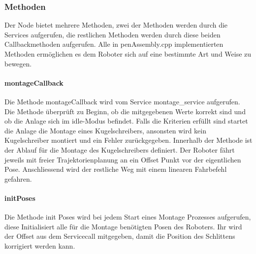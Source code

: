 \subsubsection{Methoden}
Der Node bietet mehrere Methoden, zwei der Methoden werden durch die Services aufgerufen, die restlichen Methoden werden durch diese beiden Callbackmethoden aufgerufen. Alle in penAssembly.cpp implementierten Methoden ermöglichen es dem Roboter sich auf eine bestimmte Art und Weise zu bewegen. 

\paragraph{montageCallback}
Die Methode montageCallback wird vom Service montage\_service aufgerufen. Die Methode überprüft zu Beginn, ob die mitgegebenen Werte korrekt sind und ob die Anlage sich im idle-Modus befindet. Falls die Kriterien erfüllt sind startet die Anlage die Montage eines Kugelschreibers, ansonsten wird kein Kugelschreiber montiert und ein Fehler zurückgegeben. Innerhalb der Methode ist der Ablauf für die Montage des Kugelschreibers definiert. Der Roboter fährt jeweils mit freier Trajektorienplanung an ein Offset Punkt vor der eigentlichen Pose. Anschliessend wird der restliche Weg mit einem linearen Fahrbefehl gefahren. 

\paragraph{initPoses}
Die Methode init Poses wird bei jedem Start eines Montage Prozesses aufgerufen, diese Initialisiert alle für die Montage benötigten Posen des Roboters. Ihr wird der Offset aus dem Servicecall mitgegeben, damit die Position des Schlittens korrigiert werden kann.

